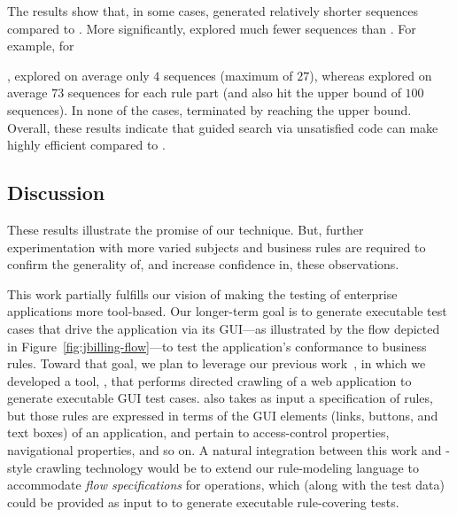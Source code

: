 The results show that, in some cases, \tool{} generated relatively shorter
sequences compared to \exhaust{}. More significantly, \tool{} explored much
fewer sequences than \exhaust{}. For example, for \subject{Cebu-pacific},
\tool{} explored on average only $4$ sequences (maximum of $27$), whereas
\exhaust{} explored on average $73$ sequences for each rule part (and also hit
the upper bound of $100$ sequences). In none of the cases, \tool{} terminated by
reaching the upper bound. Overall, these results indicate that guided search via
unsatisfied code can make \tool{} highly efficient compared to \exhaust{}.

\subsection{Discussion}

These results illustrate the promise of our technique. But, further
experimentation with more varied subjects and business rules are required to
confirm the generality of, and increase confidence in, these observations.

This work partially fulfills our vision of making the testing of enterprise
applications more tool-based. Our longer-term goal is to generate executable
test cases that drive the application via its GUI---as illustrated by the flow
depicted in Figure~\ref{fig:jbilling-flow}---to test the application's
conformance to business rules. Toward that goal, we plan to leverage our
previous work~\cite{Thummalapenta:2013}, in which we developed a tool, \wateg{},
that performs directed crawling of a web application to generate executable GUI
test cases. \wateg{} also takes as input a specification of rules, but those
rules are expressed in terms of the GUI elements (\eg links, buttons, and text
boxes) of an application, and pertain to access-control properties, navigational
properties, and so on.  A natural integration between this work and
\wateg{}-style crawling technology would be to extend our rule-modeling language
to accommodate \textit{flow specifications} for operations, which (along with
the test data) could be provided as input to \wateg{} to generate executable
rule-covering tests.
